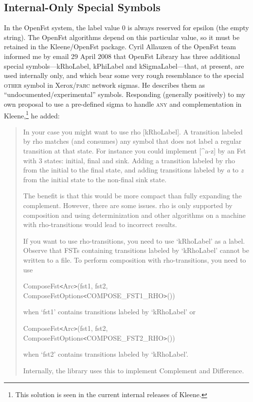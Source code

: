 \documentclass[letterpaper,11pt]{article}
\providecommand{\acro}{}\renewcommand{\acro}{\textsc}
\begin{document}
\subsection{Internal-Only Special Symbols}

In the OpenFst system, the label value 0 is always reserved for epsilon (the
empty string).  The OpenFst algorithms depend on this particular
value, so it must be retained in the Kleene/OpenFst package.
Cyril Allauzen of the OpenFst team informed me by email 29 April 2008 that OpenFst Library has three  
additional special symbols---kRhoLabel, kPhiLabel and kSigmaLabel---that, at present,  
are used internally only, and which bear some very rough resemblance to  
the special \acro{other} symbol in Xerox/\acro{parc} network sigmas.    He describes  
them as ``undocumented/experimental'' symbols.  Responding (generally positively) 
to my own proposal to use a pre-defined
sigma to handle \acro{any} and complementation in Kleene,\footnote{This solution
is seen in the current internal releases of Kleene.} he added:


\begin{quotation}
In your case you might want to use rho [kRhoLabel]. A transition labeled by rho
matches (and consumes) any symbol that does not label a regular transition
at that state. For instance you could implement [\^{}a-z] by an Fst with 3
states: initial, final and sink. Adding a transition labeled by rho from
the initial to the final state, and adding transitions labeled by
\emph{a} to \emph{z}
from the initial state to the non-final sink state.

The benefit is that this would be more compact than fully expanding the
complement. However, there are some issues. rho is only supported by
composition and using determinization and other algorithms on a machine
with rho-transitions would lead to incorrect results.

If you want to use rho-transitions, you need to use `kRhoLabel' as a
label. Observe that FSTs containing transitions labeled by `kRhoLabel'
cannot be written to a file.  To perform composition with rho-transitions,
you need to use

\noindent
ComposeFst\verb!<!Arc\verb!>!(fst1, fst2, ComposeFstOptions\verb!<!COMPOSE\_FST1\_RHO\verb!>!())

\noindent
when `fst1' contains transitions labeled by `kRhoLabel' or

\noindent
ComposeFst\verb!<!Arc\verb!>!(fst1, fst2, ComposeFstOptions\verb!<!COMPOSE\_FST2\_RHO\verb!>!())

\noindent
when `fst2' contains transitions labeled by `kRhoLabel'.

Internally, the library uses this to implement Complement and Difference.
\end{quotation}
\end{document}
